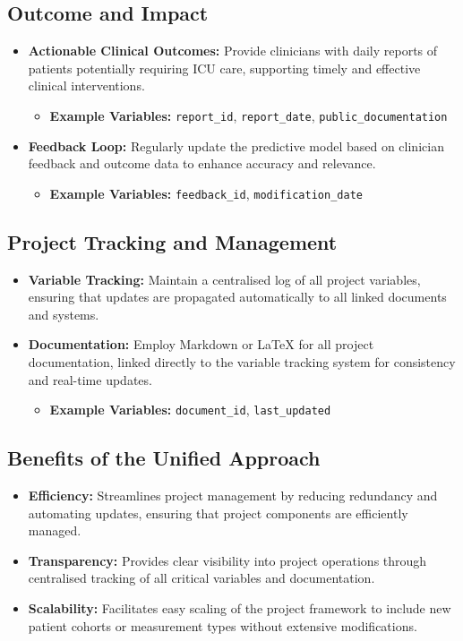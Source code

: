 \subsection*{Outcome and Impact}
\begin{itemize}
    \item \textbf{Actionable Clinical Outcomes:} Provide clinicians with daily reports of patients potentially requiring ICU care, supporting timely and effective clinical interventions.
    \begin{itemize}
        \item \textbf{Example Variables:} \texttt{report\_id}, \texttt{report\_date}, \texttt{public\_documentation}
    \end{itemize}
    \item \textbf{Feedback Loop:} Regularly update the predictive model based on clinician feedback and outcome data to enhance accuracy and relevance.
    \begin{itemize}
        \item \textbf{Example Variables:} \texttt{feedback\_id}, \texttt{modification\_date}
    \end{itemize}
\end{itemize}

\subsection*{Project Tracking and Management}
\begin{itemize}
    \item \textbf{Variable Tracking:} Maintain a centralised log of all project variables, ensuring that updates are propagated automatically to all linked documents and systems.
    \item \textbf{Documentation:} Employ Markdown or LaTeX for all project documentation, linked directly to the variable tracking system for consistency and real-time updates.
    \begin{itemize}
        \item \textbf{Example Variables:} \texttt{document\_id}, \texttt{last\_updated}
    \end{itemize}
\end{itemize}

\subsection*{Benefits of the Unified Approach}
\begin{itemize}
    \item \textbf{Efficiency:} Streamlines project management by reducing redundancy and automating updates, ensuring that project components are efficiently managed.
    \item \textbf{Transparency:} Provides clear visibility into project operations through centralised tracking of all critical variables and documentation.
    \item \textbf{Scalability:} Facilitates easy scaling of the project framework to include new patient cohorts or measurement types without extensive modifications.
\end{itemize}



